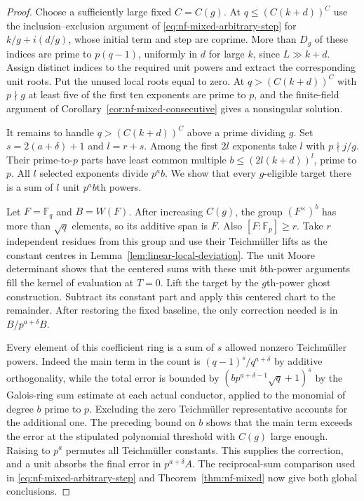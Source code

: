 \documentclass[11pt,letterpaper]{article}
\theoremstyle{definition}
\numberwithin{equation}{section}
\begin{document}
\begin{proof}
Choose a sufficiently large fixed $C=C(g)$. At
$q\le(C(k+d))^C$ use the inclusion--exclusion argument of
\eqref{eq:nf-mixed-arbitrary-step} for $k/g+i(d/g)$, whose
initial term and step are coprime. More than $D_g$ of these
indices are prime to $p(q-1)$, uniformly in $d$ for large $k$,
since $L\gg k+d$. Assign distinct indices to the required unit
powers and extract the corresponding unit roots. Put the unused
local roots equal to zero. At $q>(C(k+d))^C$ with $p\nmid g$ at
least five of the first ten exponents are prime to $p$, and the
finite-field argument of Corollary~\ref{cor:nf-mixed-consecutive}
gives a nonsingular solution.

It remains to handle $q>(C(k+d))^C$ above a prime dividing $g$.
Set $s=2(a+\delta)+1$ and $l=r+s$. Among the first $2l$ exponents
take $l$ with $p\nmid j/g$. Their prime-to-$p$ parts have least
common multiple $b\le(2l(k+d))^l$, prime to $p$. All $l$ selected
exponents divide $p^a b$. We show that every $g$-eligible target
there is a sum of $l$ unit $p^a b$th powers.

Let $F=\mathbb F_q$ and $B=W(F)$. After increasing $C(g)$,
the group $(F^\times)^b$ has more than $\sqrt q$ elements, so
its additive span is $F$. Also $[F:\mathbb F_p]\ge r$. Take $r$
independent residues from this group and use their Teichm\"uller
lifts as the constant centres in Lemma~\ref{lem:linear-local-deviation}.
The unit Moore determinant shows that the centered sums with
these unit $b$th-power arguments fill the kernel of evaluation at
$T=0$. Lift the target by the $g$th-power ghost construction.
Subtract its constant part and apply this centered chart to the
remainder. After restoring the fixed baseline, the only correction
needed is in $B/p^{a+\delta}B$.

Every element of this coefficient ring is a sum of $s$ allowed
nonzero Teichm\"uller powers. Indeed the main term in the count is
$(q-1)^s/q^{a+\delta}$ by additive orthogonality, while the total
error is bounded by $(b p^{a+\delta-1}\sqrt q+1)^s$ by the
Galois-ring sum estimate \cite{hkhc} at each actual conductor,
applied to the monomial of degree $b$ prime to $p$.
Excluding the zero Teichm\"uller representative accounts for the
additional one. The preceding bound on $b$ shows that the main term
exceeds the error at the stipulated polynomial threshold with $C(g)$
large enough. Raising to $p^a$ permutes all Teichm\"uller constants.
This supplies the correction, and a unit absorbs the final error in
$p^{a+\delta}A$. The reciprocal-sum comparison used in \eqref{eq:nf-mixed-arbitrary-step} and Theorem~\ref{thm:nf-mixed} now give
both global conclusions.
\end{proof}
\end{document}
